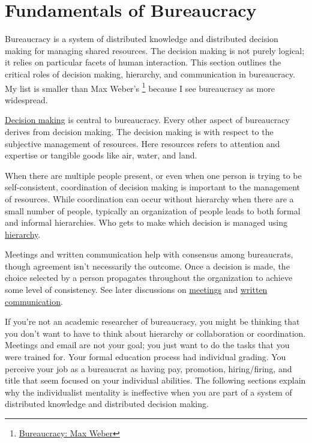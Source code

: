 \section*{Fundamentals of Bureaucracy\label{sec:fundamentals-of-b}}
  
Bureaucracy is a system of distributed knowledge and distributed decision making for managing shared resources. The decision making is not purely logical; it relies on particular facets of human interaction. This section outlines the critical roles of decision making, hierarchy, and communication in bureaucracy. 
My list is smaller than Max Weber's \cite{2015_Weber}\footnote{\href{https://en.wikipedia.org/wiki/Bureaucracy\#Max_Weber}{Bureaucracy: Max Weber}} because I see bureaucracy as more widespread.

\hyperref[sec:decision-making]{Decision making} %
is central to bureaucracy. Every other aspect of bureaucracy derives from decision making. The decision making is with respect to the subjective management of resources. Here resources refers to attention and expertise or tangible goods like air, water, and land. 

When there are multiple people present, or even when one person is trying to be self-consistent, coordination of decision making is important to the management of resources. While coordination can occur without hierarchy when there are a small number of people, typically an organization of people leads to both formal and informal hierarchies. Who gets to make which decision is managed using
\hyperref[sec:hierarchy-of-roles]{hierarchy}.

Meetings and written communication help with consensus among bureaucrats, though agreement isn't necessarily the outcome.
Once a decision is made, the choice selected by a person propagates throughout the organization to achieve some level of consistency. 
See later discussions on
\hyperref[sec:meetings-for-coordination]{meetings} and 
\hyperref[sec:written-communication]{written communication}.

If you're not an academic researcher of bureaucracy, you might be thinking that you don't want to have to think about hierarchy or collaboration or coordination. Meetings and email are not your goal; you just want to do the tasks that you were trained for. Your formal education process had individual grading. You perceive your job as a bureaucrat as having pay, promotion, hiring/firing, and title that  seem focused on your individual abilities. The following sections explain why the individualist mentality is ineffective when you are part of a  system of distributed knowledge and distributed decision making. 


